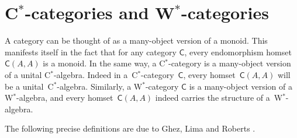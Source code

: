 \documentclass[reqno,T1,11pt]{amsproc}
\renewcommand{\H}{\mathcal{H}}	%
\newcommand{\B}[1]{\mathcal{B}(#1)}	%
\newcommand{\cat}[1]{\mathsf{#1}}		%
\theoremstyle{plain}
\theoremstyle{remark}
\numberwithin{equation}{section}
\begin{document}
\section{C$^*$-categories and W$^*$-categories}
\label{background}

A category can be thought of as a many-object version of a monoid. This manifests itself in the fact that for any category $\cat{C}$, every endomorphism homset $\cat{C}(A,A)$ is a monoid. In the same way, a C$^*$-category is a many-object version of a unital C$^*$-algebra. Indeed in a~C$^*$-category~$\cat{C}$, every homset~$\cat{C}(A,A)$ will be a unital~C$^*$-algebra. Similarly, a W$^*$-category $\cat{C}$ is a many-object version of a W$^*$-algebra, and every homset~$\cat{C}(A,A)$ indeed carries the structure of a~W$^*$-algebra.
 
\begin{comment} %
As the definitions of~C$^*$- and~W$^*$-categories
    will implicitly define~C$^*$- and W$^*$-algebras,
    we only comment briefly on the latter.
Every subalgebra of the algebra of complex~$n\times n$-matrices
    is a C$^*$- and~W$^*$-algebra.
More generally, every norm closed and $*$-closed subalgebra of~$\B{\H}$,
    the bounded operators on a Hilbert space~$\H$,
    is a C$^*$-algebra and, in fact,
    every C$^*$-algebra is isomorphic to such a subalgebra
        of~$\B{\H}$ for some Hilbert space~$\H$.
Every weakly closed subalgebra of~$\B{\H}$ is a W$^*$-algebra,
    and every W$^*$-algebra is isomorphic to such a weakly closed subalgebra.
Moreover, every commutative unital C$^*$-algebra is isomorphic to~$C(X)$ for some
    compact Hausdorff space~$X$, 
        and every commutative W$^*$-algebra is isomorphic to~$L^\infty(X,\mu)$ for some
            complete finite measure space~$(X,\mu)$.
\end{comment}

    The following precise definitions are due to Ghez, Lima and Roberts \cite{wstarcat}.
\end{document}
